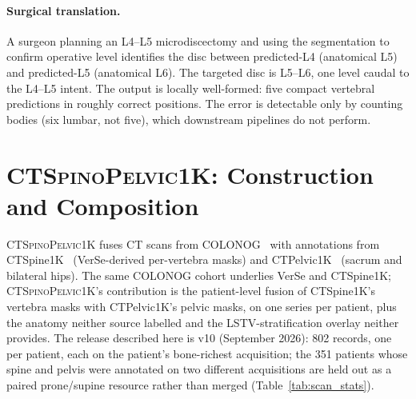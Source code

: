 \documentclass{article}
\newcommand{\dataset}{\textsc{CTSpinoPelvic1K}}
\newcommand{\VerSe}{VerSe}
\begin{document}
\paragraph{Surgical translation.}
A surgeon planning an L4--L5 microdiscectomy and using the
segmentation to confirm operative level identifies the
disc between predicted-L4 (anatomical L5) and predicted-L5
(anatomical L6). The targeted disc is L5--L6, one level
caudal to the L4--L5 intent. The output is locally
well-formed: five compact vertebral predictions in roughly
correct positions. The error is detectable only by
counting bodies (six lumbar, not five), which downstream
pipelines do not perform.

\section{\dataset{}: Construction and Composition}
\label{sec:dataset}

\dataset{} fuses CT scans from
COLONOG~\citep{Smith2015DataCOLONOGRAPHY} with annotations
from CTSpine1K~\citep{Deng2021CTSpine1K:Tomography}
(\VerSe{}-derived per-vertebra masks) and
CTPelvic1K~\citep{Liu2021DeepModels} (sacrum and bilateral
hips). The same COLONOG cohort underlies \VerSe{} and
CTSpine1K; \dataset{}'s contribution is the patient-level
fusion of CTSpine1K's vertebra masks with CTPelvic1K's
pelvic masks, on one series per patient, plus the anatomy
neither source labelled and the LSTV-stratification
overlay neither provides. The release described here is
v10 (September 2026): 802 records, one per patient, each
on the patient's bone-richest acquisition; the 351
patients whose spine and pelvis were annotated on two
different acquisitions are held out as a paired
prone/supine resource rather than merged
(Table~\ref{tab:scan_stats}).
\end{document}
